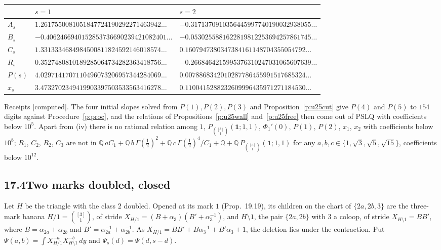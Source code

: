 \documentclass[11pt]{article}
\newcommand{\one}{\mathbf 1}
\newcommand{\Pth}{P_{\binom{[3]}1}(\one;1,1)}
\theoremstyle{plain}
\theoremstyle{definition}
\theoremstyle{remark}
\newcommand{\computed}{\textup{[computed]}}
\begin{document}
\begin{center}
\small
\begin{tabular}{@{}l l l@{}}
\toprule
& $s=1$ & $s=2$\\ \midrule
$A_s$ & $1.2617550081051847724190292271463942\ldots$ & $-0.3171370910356445997740190032938055\ldots$\\
$B_s$ & $-0.4062466940152853736690239421082401\ldots$ & $-0.0530255881622819812253694257861745\ldots$\\
$C_s$ & $1.3313334684984500811824592146018574\ldots$ & $0.1607947380347384161148704355054792\ldots$\\
$R_s$ & $0.3527480810189285064734282363418756\ldots$ & $-0.2668464215995376310247031065607639\ldots$\\
$P(s)$ & $4.0297141707110496073206957344284069\ldots$ & $0.0078868342010287786455991517685324\ldots$\\
$x_s$ & $3.4732702349419903397503533563416278\ldots$ & $0.1100415288232609996435971271184530\ldots$\\
\bottomrule
\end{tabular}
\end{center}

\noindent Receipts \computed. The four initial slopes solved from $P(1),P(2),P(3)$ and Proposition~\ref{p:u25cut} give $P(4)$ and $P(5)$ to $154$ digits against Procedure~\ref{p:proc}, and the relations of Propositions~\ref{p:u25wall} and~\ref{p:u25free} then come out of PSLQ with coefficients below $10^5$. Apart from (iv) there is no rational relation among $1$, $\Pth$, $\Phi_1'(0)$, $P(1)$, $P(2)$, $x_1$, $x_2$ with coefficients below $10^8$; $R_1$, $C_2$, $R_2$, $C_3$ are not in $\mathbb Q\,aC_1+\mathbb Q\,b\,\Gamma(\frac12)^2+\mathbb Q\,c\,\Gamma(\frac12)^4/C_1+\mathbb Q+\mathbb Q\,\Pth$ for any $a,b,c\in\{1,\sqrt3,\sqrt5,\sqrt{15}\}$, coefficients below $10^{12}$.

\subsection*{17.4\quad Two marks doubled, closed}

Let $H$ be the triangle with the class $2$ doubled. Opened at its mark $1$ (Prop.~19.19), its children on the chart of $\{2a,2b,3\}$ are the three-mark banana $H/1=\binom{[3]}1$, of stride $X_{H/1}=(B+\alpha_3)(B'+\alpha_3^{-1})$, and $H\setminus1$, the pair $\{2a,2b\}$ with $3$ a coloop, of stride $X_{H\setminus1}=BB'$, where $B=\alpha_{2a}+\alpha_{2b}$ and $B'=\alpha_{2a}^{-1}+\alpha_{2b}^{-1}$. As $X_{H/1}=BB'+B\alpha_3^{-1}+B'\alpha_3+1$, the deletion lies under the contraction. Put $\Psi(a,b)=\int X_{H/1}^{-a}X_{H\setminus1}^{-b}\,dy$ and $\Psi_s(d)=\Psi(d,s-d)$.
\end{document}
